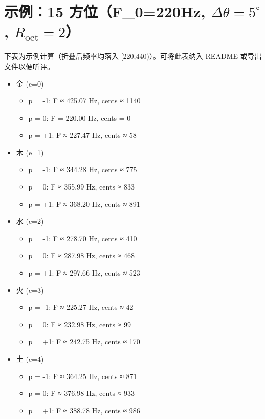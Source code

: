 \documentclass{article}
\begin{document}
\section{示例：15 方位（F\_0=220Hz, \(\Delta\theta=5^\circ\), \(R_{\mathrm{oct}}=2\)）}
下表为示例计算（折叠后频率均落入 [220,440)）。可将此表纳入 README 或导出文件以便听评。

\begin{itemize}
  \item 金 (e=0)
    \begin{itemize}
      \item p = -1: F ≈ 425.07 Hz, cents ≈ 1140
      \item p =  0: F = 220.00 Hz, cents = 0
      \item p = +1: F ≈ 227.47 Hz, cents ≈ 58
    \end{itemize}
  \item 木 (e=1)
    \begin{itemize}
      \item p = -1: F ≈ 344.28 Hz, cents ≈ 775
      \item p =  0: F ≈ 355.99 Hz, cents ≈ 833
      \item p = +1: F ≈ 368.20 Hz, cents ≈ 891
    \end{itemize}
  \item 水 (e=2)
    \begin{itemize}
      \item p = -1: F ≈ 278.70 Hz, cents ≈ 410
      \item p =  0: F ≈ 287.98 Hz, cents ≈ 468
      \item p = +1: F ≈ 297.66 Hz, cents ≈ 523
    \end{itemize}
  \item 火 (e=3)
    \begin{itemize}
      \item p = -1: F ≈ 225.27 Hz, cents ≈ 42
      \item p =  0: F ≈ 232.98 Hz, cents ≈ 99
      \item p = +1: F ≈ 242.75 Hz, cents ≈ 170
    \end{itemize}
  \item 土 (e=4)
    \begin{itemize}
      \item p = -1: F ≈ 364.25 Hz, cents ≈ 871
      \item p =  0: F ≈ 376.98 Hz, cents ≈ 933
      \item p = +1: F ≈ 388.78 Hz, cents ≈ 986
    \end{itemize}
\end{itemize}
\end{document}
